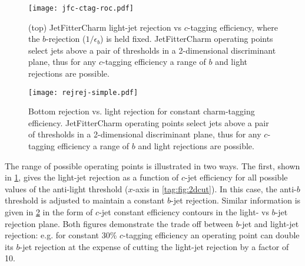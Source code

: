 \begin{figure}
  \begin{center}
    \texttt{[image: jfc-ctag-roc.pdf]}
  \caption[Several ROC curves for various $b$-jet rejections]{
    (top) JetFitterCharm light-jet rejection vs $c$-tagging efficiency, where the $b$-rejection ($1/\epsilon_b$) is held fixed. JetFitterCharm operating points select jets above a pair of thresholds in a 2-dimensional discriminant plane, thus for any $c$-tagging efficiency a range of $b$ and light rejections are possible.}
  \label{fig:perf-roc}
  \end{center}
\end{figure}

\begin{figure}
  \begin{center}
    \texttt{[image: rejrej-simple.pdf]}
  \caption[Light and $b$ rejection for various $c$-tagging efficiencies]{
    Bottom rejection vs. light rejection for constant charm-tagging efficiency. JetFitterCharm operating points select jets above a pair of thresholds in a 2-dimensional discriminant plane, thus for any $c$-tagging efficiency a range of $b$ and light rejections are possible.}
  \label{fig:perf-iso}
  \end{center}
\end{figure}

The range of possible operating points is illustrated in two ways. The first, shown in \cref{fig:perf-roc}, gives the light-jet rejection as a function of $c$-jet efficiency for all possible values of the anti-light threshold ($x$-axis in \cref{tag:fig:2dcut}). In this case, the anti-$b$ threshold is adjusted to maintain a constant $b$-jet rejection. Similar information is given in \cref{fig:perf-iso} in the form of $c$-jet constant efficiency contours in the light- vs $b$-jet rejection plane. Both figures demonstrate the trade off between $b$-jet and light-jet rejection: e.g. for constant 30\% $c$-tagging efficiency an operating point can double its $b$-jet rejection at the expense of cutting the light-jet rejection by a factor of 10.




